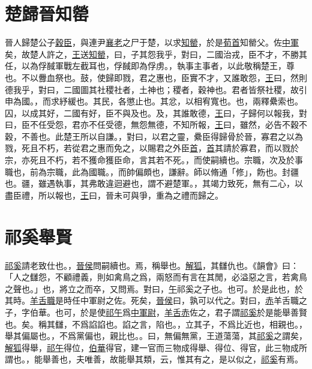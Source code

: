 \documentclass{article}
\newcommand{\tsu}{\small\kaishu\color{brown}}
\begin{document}
\section{楚歸晉知罃}

\noindent{\tsu 成公三年}

晉人歸楚公子\uline{穀臣}，與連尹\uline{襄老}之尸于楚，以求\uline{知罃}，於是\uline{荀首}{\tsu 知罃父。}佐\uline{中軍}矣，故楚人許之，\uline{王}送\uline{知罃}，曰，子其怨我乎，對曰，二國治戎，臣不才，不勝其任，以為俘馘{\tsu 軍戰左截耳也，俘馘即為俘虏。}，執事{\tsu 主事者，以此敬稱楚王，尊也。}不以釁{\tsu 血祭也。}鼓，使歸即戮，君之惠也，臣實不才，又誰敢怨，\uline{王}曰，然則德我乎，對曰，二國圖其社稷{\tsu 社者，土神也；稷者，穀神也。君者皆祭社稷，故引申為國。}，而求紓{\tsu 緩也。}其民，各懲{\tsu 止也。}其忿，以相宥{\tsu 寬也。}也，兩釋纍{\tsu 索也。}囚，以成其好，二國有好，臣不與{\tsu 及也。}及，其誰敢德，\uline{王}曰，子歸何以報我，對曰，臣不任受怨，君亦不任受德，無怨無德，不知所報，\uline{王}曰，雖然，必告不穀{\tsu 不穀，不善也。此楚王所以自謙。}，對曰，以君之靈，纍臣得歸骨於晉，寡君之以為戮，死且不朽，若從君之惠而免之，以賜君之外臣\uline{首}，\uline{首}其請於寡君，而以戮於宗，亦死且不朽，若不獲命{\tsu 獲臣命，言其若不死。}，而使嗣{\tsu 續也。}宗職，次及於事{\tsu 職也，前為宗職，此為國職。}，而帥偏{\tsu 頗也，謙辭。}師以脩{\tsu 通「修」，飭也。}封{\tsu 疆也。}疆，雖遇執事，其弗敢違{\tsu 迴避也，謂不避楚軍。}，其竭力致死，無有二心，以盡臣禮，所以報也，\uline{王}曰，晉未可與爭，重為之禮而歸之。

\section{祁奚舉賢}

\noindent{\tsu 襄公三年}

\uline{祁奚}請老{\tsu 致仕也。}，\uline{晉侯}問嗣{\tsu 續也。}焉，稱{\tsu 舉也。}\uline{解狐}，其讎{\tsu 仇也。《韻會》曰：「人之讎怨，不顧禮義，則如禽鳥之爲，兩怒而有言在其閒，必溢惡之言，若禽鳥之聲也。」}也，將立之而卒，又問焉。對曰，\uline{午}{\tsu 祁奚之子也。}也可。於是{\tsu 此也，於其時。}\uline{羊舌職}{\tsu 是時任中軍尉之佐。}死矣，\uline{晉侯}曰，孰可以代之。對曰，\uline{赤}{\tsu 羊舌職之子，字伯華。}也可，於是使\uline{祁午}爲\uline{中軍尉}，\uline{羊舌赤}佐之，君子謂\uline{祁奚}於是能舉善{\tsu 賢也。}矣。稱其讎，不爲諂{\tsu 諂也。諂之言，陷也。}，立其子，不爲比{\tsu 近也，相親也。}，舉其偏{\tsu 屬也。}，不爲黨{\tsu 偏也，親比也。}。曰，無偏無黨，王道蕩蕩，其\uline{祁奚}之謂矣，\uline{解狐}得舉，\uline{祁午}得位，\uline{伯華}得官，建一官而三物成{\tsu 得舉、得位、得官，此三物成所謂也。}，能舉善也，夫唯善，故能舉其類，云，惟其有之，是以似之，\uline{祁奚}有焉。
\end{document}
